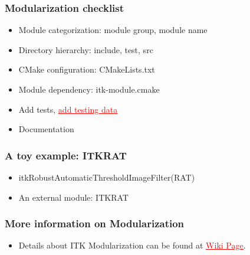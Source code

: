 \begin{frame}
\frametitle{Modularization checklist}
\begin{itemize}
\item  Module categorization: module group, module name
\pause
\item  Directory hierarchy: include, test, src
\pause
\item  CMake configuration: CMakeLists.txt
\pause
\item  Module dependency: itk-module.cmake
\pause
\item  Add tests, \href{http://www.vtk.org/Wiki/ITK/Git/Develop/Data\#Workflow}{\textcolor{red}{\underline{add testing data}}}
\pause
\item  Documentation
\end{itemize}
\end{frame}


\begin{frame}
\frametitle{A toy example: ITKRAT}
\begin{itemize}
\item  itkRobustAutomaticThresholdImageFilter(RAT)
\pause
\item  An external module: ITKRAT
\end{itemize}
\end{frame}


\begin{frame}
\frametitle{More information on Modularization}
\begin{itemize}
\item  Details about ITK Modularization can be found at \href{http://www.itk.org/Wiki/ITK\_Release\_4/Modularization}{\textcolor{red}{\underline{Wiki Page}}}.
\end{itemize}
\end{frame}
